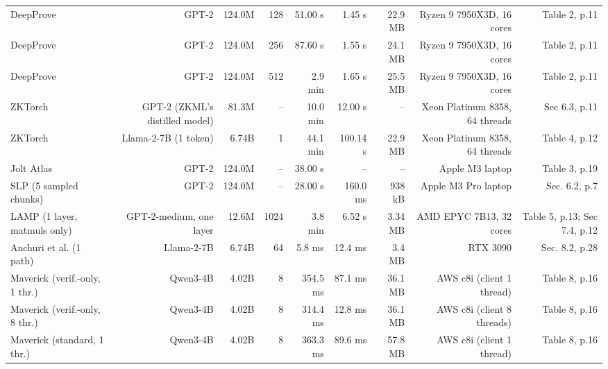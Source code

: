 \begin{tabular}{lrrrrrrrr}
DeepProve & GPT-2 & 124.0M & 128 & 51.00 s & 1.45 s & 22.9 MB & Ryzen 9 7950X3D, 16 cores & Table 2, p.11 \\
DeepProve & GPT-2 & 124.0M & 256 & 87.60 s & 1.55 s & 24.1 MB & Ryzen 9 7950X3D, 16 cores & Table 2, p.11 \\
DeepProve & GPT-2 & 124.0M & 512 & 2.9 min & 1.65 s & 25.5 MB & Ryzen 9 7950X3D, 16 cores & Table 2, p.11 \\
ZKTorch & GPT-2 (ZKML's distilled model) & 81.3M & – & 10.0 min & 12.00 s & – & Xeon Platinum 8358, 64 threads & Sec 6.3, p.11 \\
ZKTorch & Llama-2-7B (1 token) & 6.74B & 1 & 44.1 min & 100.14 s & 22.9 MB & Xeon Platinum 8358, 64 threads & Table 4, p.12 \\
Jolt Atlas & GPT-2 & 124.0M & – & 38.00 s & – & – & Apple M3 laptop & Table 3, p.19 \\
SLP (5 sampled chunks) & GPT-2 & 124.0M & – & 28.00 s & 160.0 ms & 938 kB & Apple M3 Pro laptop & Sec. 6.2, p.7 \\
LAMP (1 layer, matmuls only) & GPT-2-medium, one layer & 12.6M & 1024 & 3.8 min & 6.52 s & 3.34 MB & AMD EPYC 7B13, 32 cores & Table 5, p.13; Sec 7.4, p.12 \\
Anchuri et al. (1 path) & Llama-2-7B & 6.74B & 64 & 5.8 ms & 12.4 ms & 3.4 MB & RTX 3090 & Sec. 8.2, p.28 \\
Maverick (verif.-only, 1 thr.) & Qwen3-4B & 4.02B & 8 & 354.5 ms & 87.1 ms & 36.1 MB & AWS c8i (client 1 thread) & Table 8, p.16 \\
Maverick (verif.-only, 8 thr.) & Qwen3-4B & 4.02B & 8 & 314.4 ms & 12.8 ms & 36.1 MB & AWS c8i (client 8 threads) & Table 8, p.16 \\
Maverick (standard, 1 thr.) & Qwen3-4B & 4.02B & 8 & 363.3 ms & 89.6 ms & 57.8 MB & AWS c8i (client 1 thread) & Table 8, p.16 \\
\bottomrule
\end{tabular}

